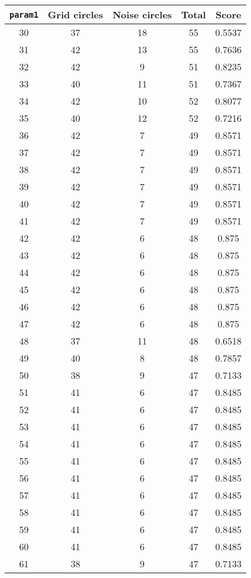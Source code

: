 \documentclass[letterpaper, 12pt]{article}
\begin{document}
\begin{longtable}{|c|c|c|c|c|}
\hline
\textbf{\texttt{param1}} & \textbf{Grid circles} & \textbf{Noise circles} & \textbf{Total} & \textbf{Score} \\
\hline
30 & 37 & 18 & 55 & 0.5537 \\
\hline
31 & 42 & 13 & 55 & 0.7636 \\
\hline
32 & 42 & 9 & 51 & 0.8235 \\
\hline
33 & 40 & 11 & 51 & 0.7367 \\
\hline
34 & 42 & 10 & 52 & 0.8077 \\
\hline
35 & 40 & 12 & 52 & 0.7216 \\
\hline
36 & 42 & 7 & 49 & 0.8571 \\
\hline
37 & 42 & 7 & 49 & 0.8571 \\
\hline
38 & 42 & 7 & 49 & 0.8571 \\
\hline
39 & 42 & 7 & 49 & 0.8571 \\
\hline
40 & 42 & 7 & 49 & 0.8571 \\
\hline
41 & 42 & 7 & 49 & 0.8571 \\
\hline
42 & 42 & 6 & 48 & 0.875 \\
\hline
43 & 42 & 6 & 48 & 0.875 \\
\hline
44 & 42 & 6 & 48 & 0.875 \\
\hline
45 & 42 & 6 & 48 & 0.875 \\
\hline
46 & 42 & 6 & 48 & 0.875 \\
\hline
47 & 42 & 6 & 48 & 0.875 \\
\hline
48 & 37 & 11 & 48 & 0.6518 \\
\hline
49 & 40 & 8 & 48 & 0.7857 \\
\hline
50 & 38 & 9 & 47 & 0.7133 \\
\hline
51 & 41 & 6 & 47 & 0.8485 \\
\hline
52 & 41 & 6 & 47 & 0.8485 \\
\hline
53 & 41 & 6 & 47 & 0.8485 \\
\hline
54 & 41 & 6 & 47 & 0.8485 \\
\hline
55 & 41 & 6 & 47 & 0.8485 \\
\hline
56 & 41 & 6 & 47 & 0.8485 \\
\hline
57 & 41 & 6 & 47 & 0.8485 \\
\hline
58 & 41 & 6 & 47 & 0.8485 \\
\hline
59 & 41 & 6 & 47 & 0.8485 \\
\hline
60 & 41 & 6 & 47 & 0.8485 \\
\hline
61 & 38 & 9 & 47 & 0.7133 \\

\end{longtable}
\end{document}
